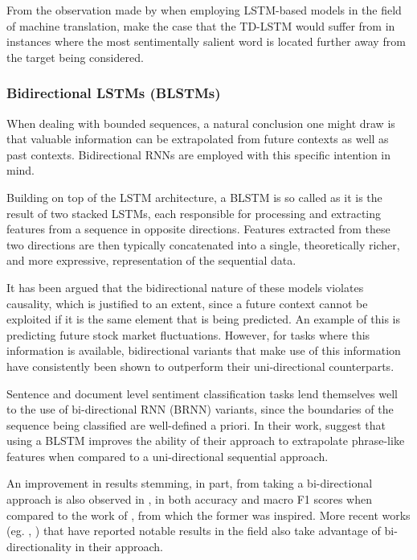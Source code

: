 \documentclass[../../fyp.tex]{subfiles}
\begin{document}
From the observation made by \cite{bahdanau2014} when employing LSTM-based models in the field of machine translation, \cite{chen2017} make the case that the TD-LSTM would suffer from in instances where the most sentimentally salient word is located further away from the target being considered.

\subsubsection{Bidirectional LSTMs (BLSTMs)}
When dealing with bounded sequences, a natural conclusion one  might draw is that valuable information can be extrapolated from future contexts as well as past contexts. Bidirectional RNNs are employed with this specific intention in mind.

Building on top of the LSTM architecture, a BLSTM is so called as it is the result of two stacked LSTMs, each responsible for processing and extracting features from a sequence in opposite directions. Features extracted from these two directions are then typically concatenated into a single, theoretically richer, and more expressive, representation of the sequential data.

It has been argued that the bidirectional nature of these models violates causality, which is justified to an extent, since a future context cannot be exploited if it is the same element that is being predicted. An example of this is predicting future stock market fluctuations. However, for tasks where this information is available, bidirectional variants that make use of this information have consistently been shown to outperform their uni-directional counterparts. \cite{graves2012b}

Sentence and document level sentiment classification tasks lend themselves well to the use of bi-directional RNN (BRNN) variants, since the boundaries of the sequence being classified are well-defined a priori. In their work, \cite{chen2017} suggest that using a BLSTM improves the ability of their approach to extrapolate phrase-like features when compared to a uni-directional sequential approach.

An improvement in results stemming, in part, from taking a bi-directional approach is also observed in \cite{zhang2016}, in both accuracy and macro F1 scores when compared to the work of \cite{vo2015}, from which the former was inspired. More recent works (eg. \cite{ma2018}, \cite{zheng2018}) that have reported notable results in the field also take advantage of bi-directionality in their approach.
\end{document}

